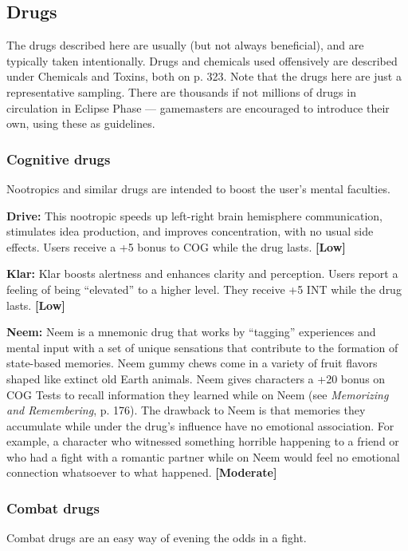 \subsection{Drugs}
\label{sec:drugs}

The drugs described here are usually (but not always beneficial), and are typically taken intentionally. Drugs and chemicals used offensively are described under Chemicals and Toxins, both on p. 323. Note that the drugs here are just a representative sampling. There are thousands if not millions of drugs in circulation in Eclipse Phase --- gamemasters are encouraged to introduce their own, using these as guidelines.

\subsubsection{Cognitive drugs}

Nootropics and similar drugs are intended to boost the user’s mental faculties.

\textbf{Drive:} This nootropic speeds up left-right brain hemisphere communication, stimulates idea production, and improves concentration, with no usual side effects. Users receive a +5 bonus to COG while the drug lasts. \textbf{[Low]}

\textbf{Klar:} Klar boosts alertness and enhances clarity and perception. Users report a feeling of being ``elevated'' to a higher level. They receive +5 INT while the drug lasts. \textbf{[Low]}

\textbf{Neem:} Neem is a mnemonic drug that works by ``tagging'' experiences and mental input with a set of unique sensations that contribute to the formation of state-based memories. Neem gummy chews come in a variety of fruit flavors shaped like extinct old Earth animals. Neem gives characters a +20 bonus on COG Tests to recall information they learned while on Neem (see \emph{Memorizing and Remembering}, p. 176). The drawback to Neem is that memories they accumulate while under the drug’s influence have no emotional association. For example, a character who witnessed something horrible happening to a friend or who had a fight with a romantic partner while on Neem would feel no emotional connection whatsoever to what happened. \textbf{[Moderate]}

\subsubsection{Combat drugs}

Combat drugs are an easy way of evening the odds in a fight.


